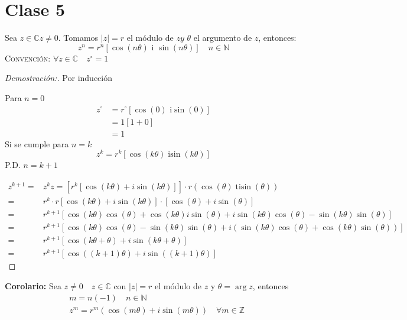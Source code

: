 \section{Clase 5}
\begin{definition}
  Sea $z \in \mathbb{C} z \neq 0$. Tomamos $|z|=r$ el módulo de $z y$ $\theta$ el argumento de $z$, entonces:
  \[
    z^n=r^n[\cos (n \theta) \text { i }\sin (n \theta)] \quad n \in \mathbb{N}
  \]
  \textsc{Convención: } $\forall z \in \mathbb{C} \quad z^{\circ}=1$
\end{definition}

\begin{proof}[Demostración:]
Por inducción

Para $n=0$
\[
  \begin{aligned}
    z^{\circ} & =r^{\circ}[\cos (0) \text { i}\sin (0)] \\
    & =1[1+0] \\
    & =1
  \end{aligned}
\]
  Si se cumple para $n=k$
\[
  z^k=r^k[\cos (k \theta) \operatorname{i \sin}(k \theta)]
\]
\textsc{P.D.} $n=k+1$ 

\[
  \begin{aligned}
    z^{k+1}= & z^k z=\left[r^k[\cos (k \theta)+i \operatorname{\sin}(k \theta)]\right] \cdot r(\cos (\theta) \operatorname{ti\sin}(\theta)) \\
    =& r^k \cdot r {[\cos (k \theta)+i \operatorname{\sin}(k \theta)] \cdot[\cos (\theta)+i \operatorname{\sin}(\theta)] } \\
    =& r^{k+1}[\cos (k \theta) \cos (\theta)+\cos (k \theta) i \operatorname{\sin}(\theta)+i \operatorname{\sin}(k \theta) \cos (\theta) -\operatorname{\sin}(k \theta) \operatorname{\sin}(\theta)]\\
    =& r^{k+1}[\cos (k \theta) \cos (\theta)-\operatorname{\sin}(k \theta) \operatorname{\sin}(\theta)+i(\operatorname{\sin}(k \theta) \cos (\theta)+\cos (k \theta) \operatorname{\sin}(\theta))] \\
    =& r^{k+1} [ \cos (k \theta+\theta)+i \operatorname{\sin}(k \theta+\theta)] \\
    =& r^{k+1}[\cos ((k+1) \theta)+i \operatorname{\sin}((k+1) \theta)]
  \end{aligned}
\]

\end{proof}
\textbf{Corolario: }Sea $z \neq 0 \quad z \in \mathbb{C}$ con $|z|=r$ el módulo de $z$ y $\theta=\arg z$, entonces
\[
  \begin{aligned}
     & m=n(-1) \quad n \in \mathbb{N} \\
     & z^m=r^m(\cos (m \theta)+i \operatorname{\sin}(m \theta)) \quad \forall m \in \mathbb{Z}
\end{aligned}
\]

